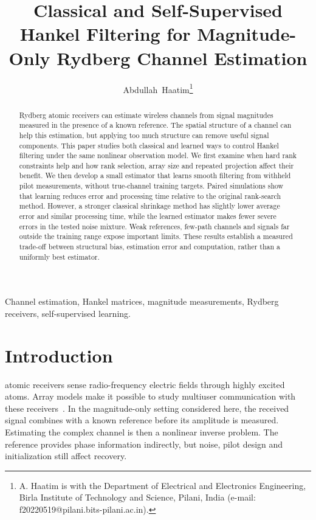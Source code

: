 \documentclass[10pt,journal,letterpaper]{IEEEtran}
\begin{document}
\title{Classical and Self-Supervised Hankel Filtering for Magnitude-Only Rydberg Channel Estimation}
\author{Abdullah~Haatim\thanks{A. Haatim is with the Department of Electrical and Electronics Engineering, Birla Institute of Technology and Science, Pilani, India (e-mail: f20220519@pilani.bits-pilani.ac.in).}}
\maketitle
\begin{abstract}
Rydberg atomic receivers can estimate wireless channels from signal magnitudes measured in the presence of a known reference. The spatial structure of a channel can help this estimation, but applying too much structure can remove useful signal components. This paper studies both classical and learned ways to control Hankel filtering under the same nonlinear observation model. We first examine when hard rank constraints help and how rank selection, array size and repeated projection affect their benefit. We then develop a small estimator that learns smooth filtering from withheld pilot measurements, without true-channel training targets. Paired simulations show that learning reduces error and processing time relative to the original rank-search method. However, a stronger classical shrinkage method has slightly lower average error and similar processing time, while the learned estimator makes fewer severe errors in the tested noise mixture. Weak references, few-path channels and signals far outside the training range expose important limits. These results establish a measured trade-off between structural bias, estimation error and computation, rather than a uniformly best estimator.
\end{abstract}
\begin{IEEEkeywords}
Channel estimation, Hankel matrices, magnitude measurements, Rydberg receivers, self-supervised learning.
\end{IEEEkeywords}

\section{Introduction}
 atomic receivers sense radio-frequency electric fields through highly excited atoms. Array models make it possible to study multiuser communication with these receivers~\cite{cui2025,gong2025mag}. In the magnitude-only setting considered here, the received signal combines with a known reference before its amplitude is measured. Estimating the complex channel is then a nonlinear inverse problem. The reference provides phase information indirectly, but noise, pilot design and initialization still affect recovery.
\end{document}
